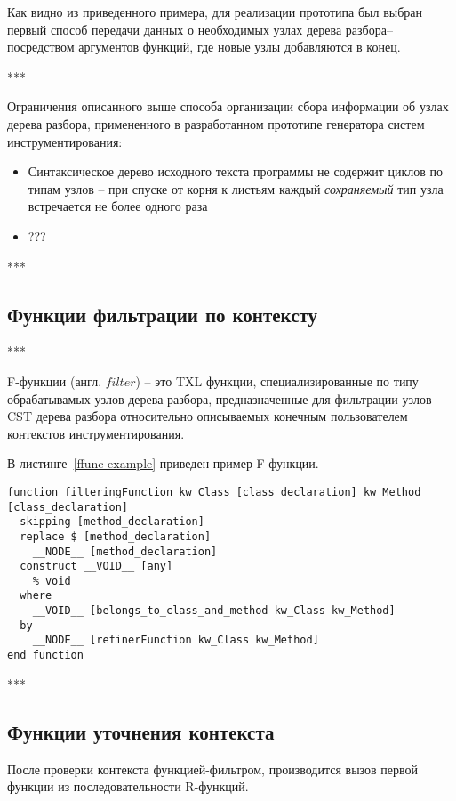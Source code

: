 Как видно из приведенного примера, для реализации прототипа был выбран первый способ передачи данных о необходимых узлах дерева разбора-- посредством аргументов функций, где новые узлы добавляются в конец.

***

Ограничения описанного выше способа организации сбора информации об узлах дерева разбора, примененного в разработанном прототипе генератора систем инструментирования:
\begin{itemize}[noitemsep]
  \item Синтаксическое дерево исходного текста программы не содержит циклов по типам узлов -- при спуске от корня к листьям каждый \textit{сохраняемый} тип узла встречается не более одного раза
  \item ???
\end{itemize}

***

\subsection{Функции фильтрации по контексту}

***

F-функции (англ. $filter$) -- это TXL функции, специализированные по типу обрабатывамых узлов дерева разбора, предназначенные для фильтрации узлов CST дерева разбора относительно описываемых конечным пользователем контекстов инструментирования.

В листинге~\ref{ffunc-example} приведен пример F-функции.

\begin{lstlisting}[language=TXL, label={ffunc-example}, caption={Пример F-функции}]
function filteringFunction kw_Class [class_declaration] kw_Method [class_declaration]
  skipping [method_declaration]
  replace $ [method_declaration]
    __NODE__ [method_declaration]
  construct __VOID__ [any]
    % void
  where
    __VOID__ [belongs_to_class_and_method kw_Class kw_Method]
  by
    __NODE__ [refinerFunction kw_Class kw_Method]
end function
\end{lstlisting}

***

\subsection{Функции уточнения контекста}

После проверки контекста функцией-фильтром, производится вызов первой функции из последовательности R-функций.

